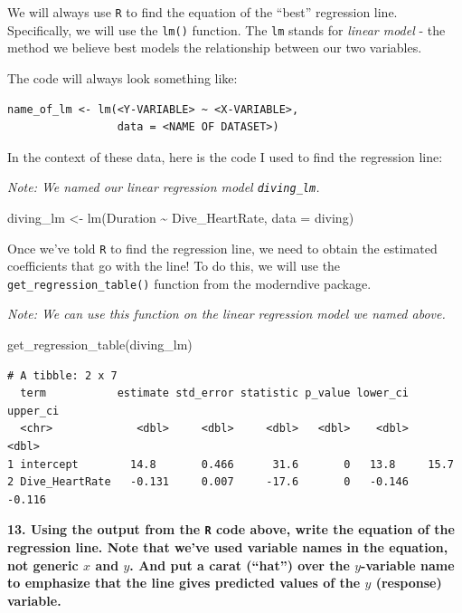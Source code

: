 \documentclass[
  letterpaper,
  DIV=11,
  numbers=noendperiod]{scrartcl}
\newenvironment{Shaded}{\begin{snugshade}}{\end{snugshade}}
\newcommand{\AttributeTok}[1]{\textcolor[rgb]{0.40,0.45,0.13}{#1}}
\newcommand{\FunctionTok}[1]{\textcolor[rgb]{0.28,0.35,0.67}{#1}}
\newcommand{\NormalTok}[1]{\textcolor[rgb]{0.00,0.23,0.31}{#1}}
\newcommand{\OtherTok}[1]{\textcolor[rgb]{0.00,0.23,0.31}{#1}}
\newcommand{\SpecialCharTok}[1]{\textcolor[rgb]{0.37,0.37,0.37}{#1}}
\begin{document}
We will always use \texttt{R} to find the equation of the ``best''
regression line. Specifically, we will use the \texttt{lm()} function.
The \texttt{lm} stands for \emph{linear model} - the method we believe
best models the relationship between our two variables.

The code will always look something like:

\begin{verbatim}
name_of_lm <- lm(<Y-VARIABLE> ~ <X-VARIABLE>, 
                 data = <NAME OF DATASET>)
\end{verbatim}

In the context of these data, here is the code I used to find the
regression line:

\emph{Note: We named our linear regression model \texttt{diving\_lm}.}

\begin{Shaded}
\begin{Highlighting}[]
\NormalTok{diving\_lm }\OtherTok{\textless{}{-}} \FunctionTok{lm}\NormalTok{(Duration }\SpecialCharTok{\textasciitilde{}}\NormalTok{ Dive\_HeartRate,}
                \AttributeTok{data =}\NormalTok{ diving)}
\end{Highlighting}
\end{Shaded}

Once we've told \texttt{R} to find the regression line, we need to
obtain the estimated coefficients that go with the line! To do this, we
will use the \texttt{get\_regression\_table()} function from the
moderndive package.

\emph{Note: We can use this function on the linear regression model we
named above.}

\begin{Shaded}
\begin{Highlighting}[]
\FunctionTok{get\_regression\_table}\NormalTok{(diving\_lm)}
\end{Highlighting}
\end{Shaded}

\begin{verbatim}
# A tibble: 2 x 7
  term           estimate std_error statistic p_value lower_ci upper_ci
  <chr>             <dbl>     <dbl>     <dbl>   <dbl>    <dbl>    <dbl>
1 intercept        14.8       0.466      31.6       0   13.8     15.7  
2 Dive_HeartRate   -0.131     0.007     -17.6       0   -0.146   -0.116
\end{verbatim}

\textbf{13. Using the output from the \texttt{R} code above, write the
equation of the regression line. Note that we've used variable names in
the equation, not generic \(x\) and \(y\). And put a carat (``hat'')
over the \(y\)-variable name to emphasize that the line gives predicted
values of the \(y\) (response) variable.}
\end{document}
